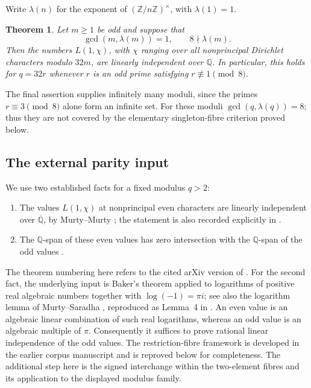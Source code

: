 \documentclass[11pt,a4paper]{article}
\newtheorem{theorem}{Theorem}[section]
\theoremstyle{definition}
\theoremstyle{remark}
\begin{document}
Write $\lambda(n)$ for the exponent of
$(\mathbb Z/n\mathbb Z)^\times$, with $\lambda(1)=1$.

\begin{theorem}
\label{bkapp:main}
Let $m\geq1$ be odd and suppose that
\[
  \gcd(m,\lambda(m))=1,
  \qquad 8\nmid\lambda(m).
\]
Then the numbers $L(1,\chi)$, with $\chi$ ranging over all nonprincipal
Dirichlet characters modulo $32m$, are linearly independent over
$\mathbb Q$.  In particular, this holds for $q=32r$ whenever $r$ is an
odd prime satisfying $r\not\equiv1\pmod8$.
\end{theorem}

The final assertion supplies infinitely many moduli, since the primes
$r\equiv3\pmod8$ alone form an infinite set.  For these moduli
$\gcd(q,\lambda(q))=8$; thus they are not covered by the elementary
singleton-fibre criterion proved below.

\subsection{The external parity input}

We use two established facts for a fixed modulus $q>2$:
\begin{enumerate}
\item The values $L(1,\chi)$ at nonprincipal even characters are linearly
independent over $\overline{\mathbb Q}$, by Murty--Murty
\cite{BK_MM2011}; the statement is also recorded explicitly in
\cite[Theorem~3]{BK_KR2022}.
\item The $\mathbb Q$-span of these even values has zero intersection
with the $\mathbb Q$-span of the odd values
\cite[Theorem~5]{BK_KR2022}.
\end{enumerate}
The theorem numbering here refers to the cited arXiv version of
\cite{BK_KR2022}.
For the second fact, the underlying input is Baker's theorem applied to
logarithms of positive real algebraic numbers together with
$\log(-1)=\pi i$; see also the logarithm lemma of Murty--Saradha
\cite{BK_MS2010}, reproduced as Lemma~4 in \cite{BK_KR2022}.
An even value is an algebraic linear combination of such real logarithms,
whereas an odd value is an algebraic multiple of $\pi$.
Consequently it suffices to prove rational linear independence of the
odd values.  The restriction-fibre framework is developed in the earlier corpus
manuscript \cite{Corpus53} and is reproved below for completeness.
The additional step here is the signed interchange within the
two-element fibres and its application to the displayed modulus family.
\end{document}
